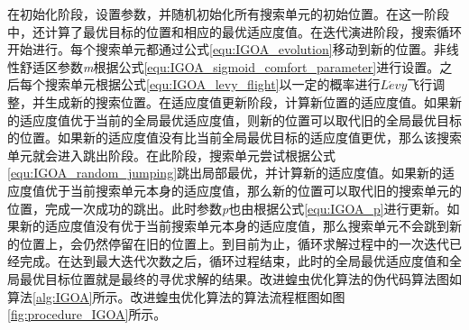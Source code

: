 在初始化阶段，设置参数，并随机初始化所有搜索单元的初始位置。在这一阶段中，还计算了最优目标的位置和相应的最优适应度值。在迭代演进阶段，搜索循环开始进行。每个搜索单元都通过公式\ref{equ:IGOA_evolution}移动到新的位置。非线性舒适区参数\emph{m}根据公式\ref{equ:IGOA_sigmoid_comfort_parameter}进行设置。之后每个搜索单元根据公式\ref{equ:IGOA_levy_flight}以一定的概率进行$L\acute{e}vy$飞行调整，并生成新的搜索位置。在适应度值更新阶段，计算新位置的适应度值。如果新的适应度值优于当前的全局最优适应度值，则新的位置可以取代旧的全局最优目标的位置。如果新的适应度值没有比当前全局最优目标的适应度值更优，那么该搜索单元就会进入跳出阶段。在此阶段，搜索单元尝试根据公式\ref{equ:IGOA_random_jumping}跳出局部最优，并计算新的适应度值。如果新的适应度值优于当前搜索单元本身的适应度值，那么新的位置可以取代旧的搜索单元的位置，完成一次成功的跳出。此时参数\emph{p}也由根据公式\ref{equ:IGOA_p}进行更新。如果新的适应度值没有优于当前搜索单元本身的适应度值，那么搜索单元不会跳到新的位置上，会仍然停留在旧的位置上。到目前为止，循环求解过程中的一次迭代已经完成。在达到最大迭代次数之后，循环过程结束，此时的全局最优适应度值和全局最优目标位置就是最终的寻优求解的结果。改进蝗虫优化算法的伪代码算法图如算法\ref{alg:IGOA}所示。改进蝗虫优化算法的算法流程框图如图\ref{fig:procedure_IGOA}所示。
